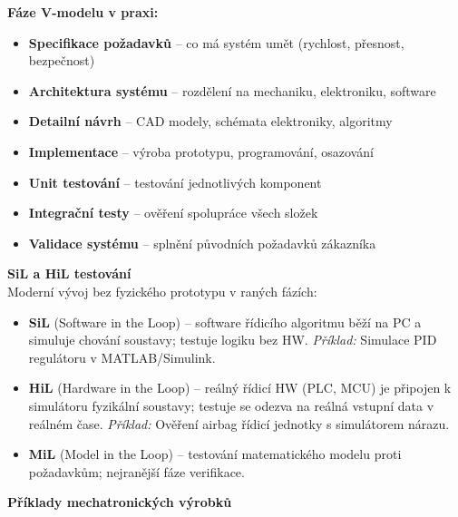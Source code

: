 \documentclass[a4paper,10pt]{article}
\begin{document}
\begin{vysvetlenibox}
\textbf{Fáze V-modelu v praxi:}
\begin{itemize}[noitemsep, leftmargin=1.4em, topsep=4pt]
    \item \textbf{Specifikace požadavků} -- co má systém umět (rychlost, přesnost, bezpečnost)
    \item \textbf{Architektura systému} -- rozdělení na mechaniku, elektroniku, software
    \item \textbf{Detailní návrh} -- CAD modely, schémata elektroniky, algoritmy
    \item \textbf{Implementace} -- výroba prototypu, programování, osazování
    \item \textbf{Unit testování} -- testování jednotlivých komponent
    \item \textbf{Integrační testy} -- ověření spolupráce všech složek
    \item \textbf{Validace systému} -- splnění původních požadavků zákazníka
\end{itemize}

\textbf{SiL a HiL testování}\\
Moderní vývoj bez fyzického prototypu v raných fázích:
\begin{itemize}[noitemsep, leftmargin=1.4em, topsep=4pt]
    \item \textbf{SiL} (Software in the Loop) -- software řídicího algoritmu
          běží na PC a simuluje chování soustavy; testuje logiku bez HW.
          \textit{Příklad:} Simulace PID regulátoru v MATLAB/Simulink.
    \item \textbf{HiL} (Hardware in the Loop) -- reálný řídicí HW (PLC, MCU)
          je připojen k simulátoru fyzikální soustavy; testuje se odezva na
          reálná vstupní data v reálném čase.
          \textit{Příklad:} Ověření airbag řídicí jednotky s simulátorem nárazu.
    \item \textbf{MiL} (Model in the Loop) -- testování matematického modelu
          proti požadavkům; nejranější fáze verifikace.
\end{itemize}

\textbf{Příklady mechatronických výrobků}


\end{vysvetlenibox}
\end{document}
